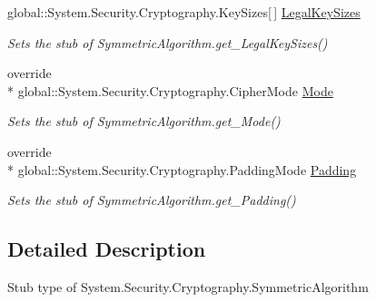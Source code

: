 \begin{DoxyCompactItemize}
global\-::\-System.\-Security.\-Cryptography.\-Key\-Sizes\mbox{[}$\,$\mbox{]} \hyperlink{class_system_1_1_security_1_1_cryptography_1_1_fakes_1_1_stub_symmetric_algorithm_a9da246dc8c278ddbfa2047007d29fc6f}{Legal\-Key\-Sizes}
\begin{DoxyCompactList}\small\item\em Sets the stub of Symmetric\-Algorithm.\-get\-\_\-\-Legal\-Key\-Sizes()\end{DoxyCompactList}\item 
override \\*
global\-::\-System.\-Security.\-Cryptography.\-Cipher\-Mode \hyperlink{class_system_1_1_security_1_1_cryptography_1_1_fakes_1_1_stub_symmetric_algorithm_af72cb6f6cd2f81df196e1025ac98db92}{Mode}
\begin{DoxyCompactList}\small\item\em Sets the stub of Symmetric\-Algorithm.\-get\-\_\-\-Mode()\end{DoxyCompactList}\item 
override \\*
global\-::\-System.\-Security.\-Cryptography.\-Padding\-Mode \hyperlink{class_system_1_1_security_1_1_cryptography_1_1_fakes_1_1_stub_symmetric_algorithm_acd823f53616acf9908a7d34956769082}{Padding}
\begin{DoxyCompactList}\small\item\em Sets the stub of Symmetric\-Algorithm.\-get\-\_\-\-Padding()\end{DoxyCompactList}\end{DoxyCompactItemize}


\subsection{Detailed Description}
Stub type of System.\-Security.\-Cryptography.\-Symmetric\-Algorithm



